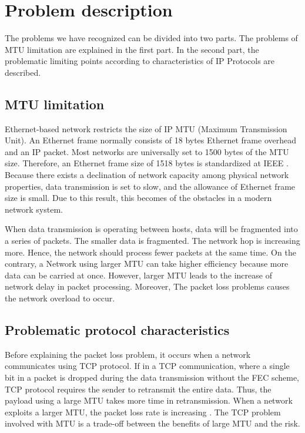 \section{Problem description}

The problems we have recognized can be divided into two parts. The problems of MTU limitation are explained in the first part. In the second part, the problematic limiting points according to characteristics of IP Protocols are described.

\subsection{MTU limitation}

Ethernet-based network restricts the size of IP MTU (Maximum Transmission Unit). An Ethernet frame normally consists of 18 bytes Ethernet frame overhead and an IP packet. Most networks are universally set to 1500 bytes of the MTU size. Therefore, an Ethernet frame size of 1518 bytes is standardized at IEEE \cite{8457469}. Because there exists a declination of network capacity among physical network properties, data transmission is set to slow, and the allowance of Ethernet frame size is small. Due to this result, this becomes of the obstacles in a modern network system. 

When data transmission is operating between hosts, data will be fragmented into a series of packets. The smaller data is fragmented. The network hop is increasing more. Hence, the network should process fewer packets at the same time. On the contrary, a Network using larger MTU can take higher efficiency because more data can be carried at once. However, larger MTU leads to the increase of network delay in packet processing. Moreover, The packet loss problems causes the network overload to occur.

\subsection{Problematic protocol characteristics}

Before explaining the packet loss problem, it occurs when a network communicates using TCP protocol. If in a TCP communication, where a single bit in a packet is dropped during the data transmission without the FEC scheme, TCP protocol requires the sender to retransmit the entire data. Thus, the payload using a large MTU takes more time in retransmission. When a network exploits a larger MTU, the packet loss rate is increasing \cite{katre2019impact}. The TCP problem involved with MTU is a trade-off between the benefits of large MTU and the risk.

